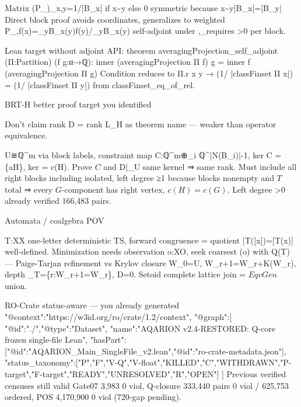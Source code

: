 Matrix (P_\Pi)_{x,y}=1/|B_x| if x\sim y else 0 symmetric because x\sim y\Rightarrow |B_x|=|B_y|
Direct block proof avoids coordinates, generalizes to weighted P_{\Pi,\mu}f(x)=\sum_{y\in B_x}\mu(y)f(y)/\sum_{y\in B_x}\mu(y) self-adjoint under \langle\cdot ,\cdot \rangle_\mu requires \mu>0 per block.

Lean target without adjoint API:
theorem averagingProjection_self_adjoint (Π:Partition) (f g:α→ℚ):
 inner (averagingProjection Π f) g = inner f (averagingProjection Π g)
Condition reduces to Π.r x y → (1/ |classFinset Π x|) = (1/ |classFinset Π y|) from classFinset_eq_of_rel.

BRT-H better proof target you identified

Don't claim rank D = rank L_H as theorem name — weaker than operator equivalence.

U≅ℚ^m via block labels, constraint map C:ℚ^m\rightarrow ⊕_i ℚ^{|N(B_i)|-1}, ker C = \{aH\}, \dim ker = c(H). Prove $C$ and D|_U same kernel ⇒ same rank. Must include all right blocks including isolated, left degree ≥1 because blocks nonempty and $T$ total ⇒ every $G$-component has right vertex, $c(H)=c(G)$. Left degree >0 already verified 166,483 pairs.

Automata / coalgebra POV

T:X\rightarrow X one-letter deterministic TS, forward congruence = quotient \bar T([x])=[T(x)] well-defined. Minimization needs observation o:X\rightarrow O, seek coarsest \Pi\le\ker(o) with \Pi\in Q(T) — Paige-Tarjan refinement vs Krylov closure W_0=U, W_{r+1}=W_r+K(W_r), depth \delta_T=\min\{r:W_{r+1}=W_r\}, D=0\Leftrightarrow {}. Setoid complete lattice join = $EqvGen$ union.

RO-Crate status-aware — you already generated
{
 "@context":"https://w3id.org/ro/crate/1.2/context",
 "@graph":[{
   "@id":"./","@type":"Dataset",
   "name":"AQARION v2.4-RESTORED: Q-core frozen single-file Lean",
   "hasPart":[{"@id":"AQARION_Main_SingleFile_v2.lean"},{"@id":"ro-crate-metadata.json"}],
   "status_taxonomy":["P","F","V-Q","V-float","KILLED","C","WITHDRAWN","P-target","F-target","READY","UNRESOLVED","R","OPEN"]
 }]
}
Previous verified censuses still valid Gate07 3,983 0 viol, Q-closure 333,440 pairs 0 viol / 625,753 ordered, POS 4,170,900 0 viol (720-gap pending).

